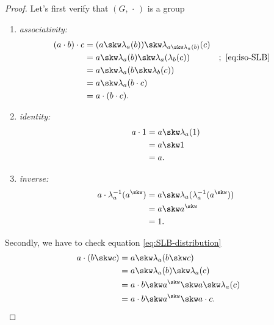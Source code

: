 \begin{proof}
    Let's first verify that $(G,\,\cdot\,)$ is a group
    \begin{enumerate}[-]
        \item \textit{associativity:}
            \begin{align*}
                (a\cdot b)\cdot c
                    &= (a\skw\lambda_a(b))\skw\lambda_{a\skw\lambda_a(b)}(c)\\
                    &= a\skw\lambda_a(b)\skw\lambda_a(\lambda_b(c))
                        &&;\ \eqref{eq:iso-SLB}\\
                    &= a\skw\lambda_a(b\skw\lambda_b(c))\\
                    &= a\skw\lambda_a(b\cdot c)\\
                    &= a\cdot(b\cdot c).
            \end{align*}

            \item \textit{identity:}
            \begin{align*}
                a\cdot1 &= a\skw\lambda_a(1)\\
                    &= a\skw1\\
                    &= a.
            \end{align*}

            \item \textit{inverse:}
                \begin{align*}
                    a\cdot\lambda_a^{-1}(a^\skw)
                        &= a\skw\lambda_a(\lambda_a^{-1}(a^\skw))\\
                        &= a\skw a^\skw\\
                        &= 1.
                \end{align*}
    \end{enumerate}
    Secondly, we have to check equation \eqref{eq:SLB-distribution}
    \begin{align*}
        a\cdot(b\skw c)
            &= a\skw\lambda_a(b\skw c)\\
            &= a\skw\lambda_a(b)\skw\lambda_a(c)\\
            &= a\cdot b\skw a^\skw\skw a\skw\lambda_a(c)\\
            &= a\cdot b\skw a^\skw\skw a\cdot c.
    \end{align*}


\end{proof}
